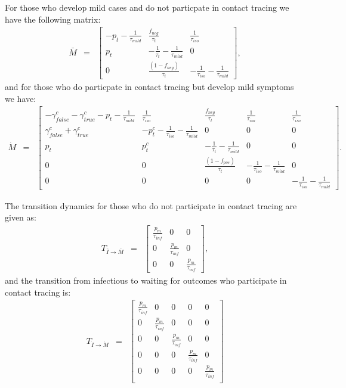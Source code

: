 \documentclass{article}
\begin{document}
For those who develop mild cases and do not particpate in contact tracing we have the following matrix:
\begin{eqnarray}
\bar{M} &=&
\begin{bmatrix}
- p_{t} -\frac{1}{\tau_{mild}}  &  \frac{f_{neg}}{\tau_{t}}            & \frac{1}{\tau_{iso}} \\ 
 p_{t}              & -\frac{1}{\tau_{t}} -\frac{1}{\tau_{mild}}       & 0  \\ 
 0                  & \frac{(1- f_{neg})}{\tau_{t}}                        & -\frac{1}{\tau_{iso}} -\frac{1}{\tau_{mild}}
\end{bmatrix},
\end{eqnarray}
and for those who do particpate in contact tracing but develop mild symptoms we have:
\begin{eqnarray}
\dot{M} &=&
\begin{bmatrix}
 -\gamma^{c}_{false} -\gamma^{c}_{true} - p_{t} -\frac{1}{\tau_{mild}} & \frac{1}{\tau_{iso}}  & \frac{f_{neg}}{\tau_{t}} & \frac{1}{\tau_{iso}} & \frac{1}{\tau_{iso}} \\
\gamma^{c}_{false} + \gamma^{c}_{true}    &  -p^{c}_{t}  - \frac{1}{\tau_{iso}} - \frac{1}{\tau_{mild}}      &  0    & 0  & 0\\
p_{t}     &  p^{c}_{t}                  &  -\frac{1}{\tau_{t}}  - \frac{1}{\tau_{mild}}  & 0 & 0\\
0 & 0 & \frac{(1-f_{pos})}{\tau_{t}}  & -\frac{1}{\tau_{iso}}  -  \frac{1}{\tau_{mild}} & 0 \\ 
0 & 0 & 0 & 0 & -\frac{1}{\tau_{iso}}  -  \frac{1}{\tau_{mild}}
\end{bmatrix}.
\end{eqnarray}

The transition dynamics for those who do not participate in contact tracing are given as:
\begin{eqnarray}
T_{\bar{I} \rightarrow \bar{M}} &=&
\begin{bmatrix}
\frac{p_{m}}{\tau_{inf}}  & 0                 & 0 \\ 
 0          &  \frac{p_{m}}{\tau_{inf}}  & 0 \\ 
 0          & 0                 &  \frac{p_{m}}{\tau_{inf}} 
\end{bmatrix},
\end{eqnarray}
and the transition from infectious to waiting for outcomes who participate in contact tracing is:
\begin{eqnarray}
T_{\dot{I} \rightarrow \dot{M}} &=&
\begin{bmatrix}
\frac{p_{m}}{\tau_{inf}}  & 0                 & 0 & 0 & 0\\ 
 0          &  \frac{p_{m}}{\tau_{inf}}  & 0 & 0 & 0 \\ 
 0          & 0                 &  \frac{p_{m}}{\tau_{inf}} & 0 & 0 \\ 
0           & 0                 &  0 & \frac{p_{m}}{\tau_{inf}} & 0 \\ 
0           & 0                 &  0 & 0 & \frac{p_{m}}{\tau_{inf}} \\
\end{bmatrix}
\end{eqnarray}
\end{document}
